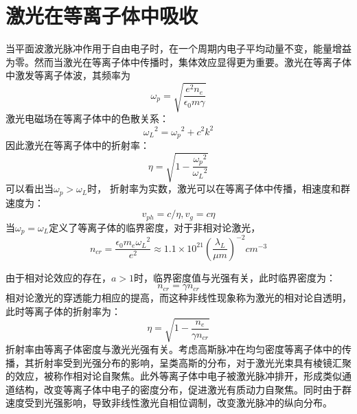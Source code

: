 \section{激光在等离子体中吸收}




当平面波激光脉冲作用于自由电子时，在一个周期内电子平均动量不变，能量增益为零。然而当激光在等离子体中传播时，集体效应显得更为重要。激光在等离子体中激发等离子体波，其频率为
\begin{equation}
\label{eqn:plasmafrequency}
\omega_p=\sqrt{\frac{e^2 n_e}{\epsilon_0 m \gamma}}
\end{equation}
激光电磁场在等离子体中的色散关系\cite{kruer1988physics}：
\begin{equation}
\label{eqn:chromatic}
{{\omega}_L}^2={{\omega}_p}^2 + c^2 k^2
\end{equation}
因此激光在等离子体中的折射率：
\begin{equation}
\label{eqn:defrection}
\eta=\sqrt{1- \frac{{{\omega}_p}^2}{{{\omega}_L}^2}}
\end{equation}
可以看出当$\omega_p > \omega_L$时， 折射率为实数，激光可以在等离子体中传播，相速度和群速度为：
\begin{equation}
\label{eqn:velocity}
v_{ph}=c/{\eta}, v_g=c \eta
\end{equation}
当$\omega_p = \omega_L$定义了等离子体的临界密度，对于非相对论激光，
\begin{equation}
\label{eqn:criticalDensity}
n_{cr}=\frac{\epsilon_0 m_e {{\omega}_L}^2}{e^2} \approx 1.1 \times 
10^{21} (\frac{\lambda_L}{\mu m})^{-2} {cm}^{-3}
\end{equation}

由于相对论效应的存在，$a>1$时，临界密度值与光强有关，此时临界密度为：
\begin{equation}
\label{eqn:RelcriticalDensity}
n_{cr}=\gamma n_{cr}
\end{equation}
相对论激光的穿透能力相应的提高，而这种非线性现象称为激光的相对论自透明\cite{willingale2009characterization}，此时等离子体的折射率为：
\begin{equation}
\label{eqn:Realdefrection}
\eta=\sqrt{1- \frac{n_e}{\gamma n_{cr}}}
\end{equation}
折射率由等离子体密度与激光光强有关。考虑高斯脉冲在均匀密度等离子体中的传播，其折射率受到光强分布的影响，呈类高斯的分布，对于激光光束具有棱镜汇聚的效应，被称作相对论自聚焦\cite{sprangle1987relativistic,sun1987self,chen1993necessary,esarey1997self}。此外等离子体中电子被激光脉冲排开，形成类似通道结构\cite{82}，改变等离子体中电子的密度分布，促进激光有质动力自聚焦。同时由于群速度受到光强影响，导致非线性激光自相位调制\cite{83,84}，改变激光脉冲的纵向分布。

